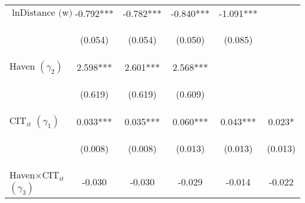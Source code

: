 \begin{center}
\begin{tabular}{lccccc}
$\ln\text{Distance (w)}$ & -0.792*** & -0.782*** & -0.840*** & -1.091*** &  \\
\vspace{4pt} & \begin{footnotesize}(0.054)\end{footnotesize} & \begin{footnotesize}(0.054)\end{footnotesize} & \begin{footnotesize}(0.050)\end{footnotesize} & \begin{footnotesize}(0.085)\end{footnotesize} & \begin{footnotesize}\end{footnotesize} \\
Haven $(\gamma_2)$ & 2.598*** & 2.601*** & 2.568*** &  &  \\
\vspace{4pt} & \begin{footnotesize}(0.619)\end{footnotesize} & \begin{footnotesize}(0.619)\end{footnotesize} & \begin{footnotesize}(0.609)\end{footnotesize} & \begin{footnotesize}\end{footnotesize} & \begin{footnotesize}\end{footnotesize} \\
$ \text{CIT}_{it}$ $(\gamma_1)$ & 0.033*** & 0.035*** & 0.060*** & 0.043*** & 0.023* \\
\vspace{4pt} & \begin{footnotesize}(0.008)\end{footnotesize} & \begin{footnotesize}(0.008)\end{footnotesize} & \begin{footnotesize}(0.013)\end{footnotesize} & \begin{footnotesize}(0.013)\end{footnotesize} & \begin{footnotesize}(0.013)\end{footnotesize} \\
Haven$\times\text{CIT}_{it}$ $ (\gamma_3)$ & -0.030 & -0.030 & -0.029 & -0.014 & -0.022 \\

\end{tabular}
\end{center}
